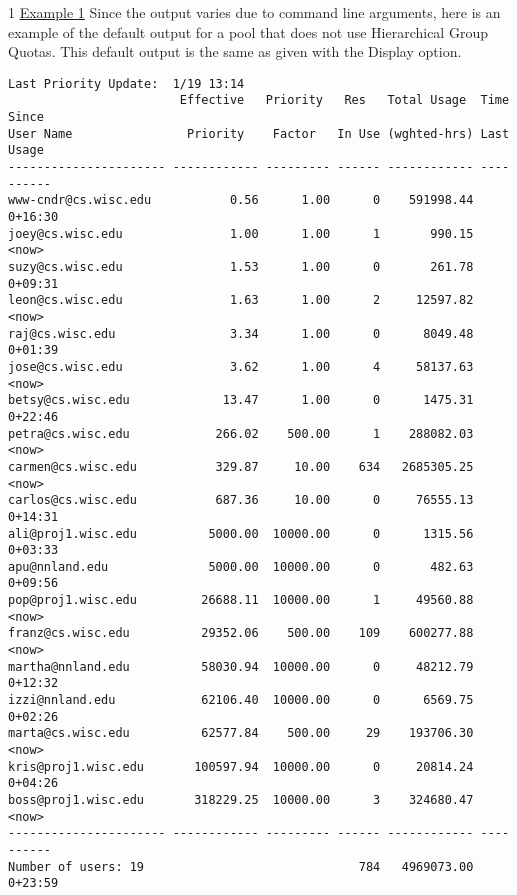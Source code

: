 \begin{ManPage}{\label{man-condor-userprio}}{1}
\underline{Example 1} Since the output varies due to command line arguments, 
here is an example of the default output for a pool that does not use 
Hierarchical Group Quotas.
This default output is the same as given with the  Display option.
\scriptsize
\begin{verbatim}
Last Priority Update:  1/19 13:14
                        Effective   Priority   Res   Total Usage  Time Since
User Name                Priority    Factor   In Use (wghted-hrs) Last Usage
---------------------- ------------ --------- ------ ------------ ----------
www-cndr@cs.wisc.edu           0.56      1.00      0    591998.44    0+16:30
joey@cs.wisc.edu               1.00      1.00      1       990.15 <now>
suzy@cs.wisc.edu               1.53      1.00      0       261.78    0+09:31
leon@cs.wisc.edu               1.63      1.00      2     12597.82 <now>
raj@cs.wisc.edu                3.34      1.00      0      8049.48    0+01:39
jose@cs.wisc.edu               3.62      1.00      4     58137.63 <now>
betsy@cs.wisc.edu             13.47      1.00      0      1475.31    0+22:46
petra@cs.wisc.edu            266.02    500.00      1    288082.03 <now>
carmen@cs.wisc.edu           329.87     10.00    634   2685305.25 <now>
carlos@cs.wisc.edu           687.36     10.00      0     76555.13    0+14:31
ali@proj1.wisc.edu          5000.00  10000.00      0      1315.56    0+03:33
apu@nnland.edu              5000.00  10000.00      0       482.63    0+09:56
pop@proj1.wisc.edu         26688.11  10000.00      1     49560.88 <now>
franz@cs.wisc.edu          29352.06    500.00    109    600277.88 <now>
martha@nnland.edu          58030.94  10000.00      0     48212.79    0+12:32
izzi@nnland.edu            62106.40  10000.00      0      6569.75    0+02:26
marta@cs.wisc.edu          62577.84    500.00     29    193706.30 <now>
kris@proj1.wisc.edu       100597.94  10000.00      0     20814.24    0+04:26
boss@proj1.wisc.edu       318229.25  10000.00      3    324680.47 <now>
---------------------- ------------ --------- ------ ------------ ----------
Number of users: 19                              784   4969073.00    0+23:59 
\end{verbatim}
\normalsize


\end{ManPage}

